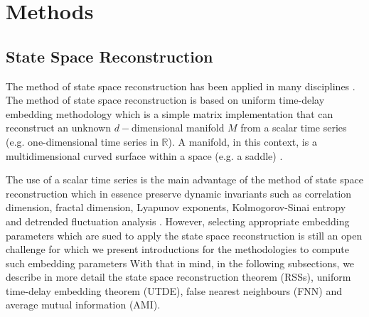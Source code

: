 \documentclass[fleqn,10pt]{wlscirep}
\begin{document}
\section*{Methods}
\subsection*{State Space Reconstruction}
The method of state space reconstruction \cite{packard1980} 
\cite{takens1981} has been applied in many disciplines 
\cite{aguirre2009, stergiou2011, frank2010, 
sama2013, Quintana-Duque2016}. The method of state space reconstruction is 
based on uniform time-delay embedding methodology which is a simple 
matrix implementation that can reconstruct an unknown $d-$dimensional 
manifold $M$ from a scalar time series (e.g. one-dimensional 
time series in $\mathbb{R}$). A manifold, in this context, is a 
multidimensional curved surface within a space (e.g. a saddle) 
\cite{guastello-gregson2011}.

The use of a scalar time series is the main advantage of the method of state 
space reconstruction which in essence preserve dynamic invariants such as 
correlation dimension, fractal dimension, Lyapunov exponents, Kolmogorov-Sinai 
entropy and detrended fluctuation analysis \cite{bradley2015, 
Quintana-Duque2012, Quintana-Duque2013, Quintana-Duque2016, krakovska2015}.
However, selecting appropriate embedding parameters which are sued to apply the 
state space reconstruction is still an open challenge for which we present 
introductions for the methodologies to compute such embedding parameters 
With that in mind, in the following subsections, we describe in more detail 
the state space reconstruction theorem (RSSs), uniform time-delay embedding 
theorem (UTDE), false nearest neighbours (FNN) and average mutual 
information (AMI). 
\end{document}
